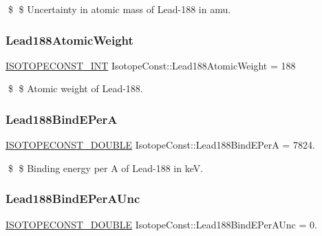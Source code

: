 \$ \$ Uncertainty in atomic mass of Lead-\/188 in amu. \mbox{\label{group___isotope_const-_lead-_pb188_ga2e9897e510550a646369dc732532142f}} 
\subsubsection{\texorpdfstring{Lead188\+Atomic\+Weight}{Lead188AtomicWeight}}
{\footnotesize\ttfamily \mbox{\hyperlink{group___isotope_const-_macros_ga5f18360b3e99483a35c32d789e62621c}{I\+S\+O\+T\+O\+P\+E\+C\+O\+N\+S\+T\+\_\+\+I\+NT}} Isotope\+Const\+::\+Lead188\+Atomic\+Weight = 188}

\$ \$ Atomic weight of Lead-\/188. \mbox{\label{group___isotope_const-_lead-_pb188_ga4e6f5200fb4dfadbeb6774725b0bb7fd}} 
\subsubsection{\texorpdfstring{Lead188\+Bind\+E\+PerA}{Lead188BindEPerA}}
{\footnotesize\ttfamily \mbox{\hyperlink{group___isotope_const-_macros_ga8f45a7272ce02c0b4c65c44636ed719a}{I\+S\+O\+T\+O\+P\+E\+C\+O\+N\+S\+T\+\_\+\+D\+O\+U\+B\+LE}} Isotope\+Const\+::\+Lead188\+Bind\+E\+PerA = 7824.}

\$ \$ Binding energy per A of Lead-\/188 in keV. \mbox{\label{group___isotope_const-_lead-_pb188_gacfa0eaf06886fb4329f50fa291b673c2}} 
\subsubsection{\texorpdfstring{Lead188\+Bind\+E\+Per\+A\+Unc}{Lead188BindEPerAUnc}}
{\footnotesize\ttfamily \mbox{\hyperlink{group___isotope_const-_macros_ga8f45a7272ce02c0b4c65c44636ed719a}{I\+S\+O\+T\+O\+P\+E\+C\+O\+N\+S\+T\+\_\+\+D\+O\+U\+B\+LE}} Isotope\+Const\+::\+Lead188\+Bind\+E\+Per\+A\+Unc = 0.}

